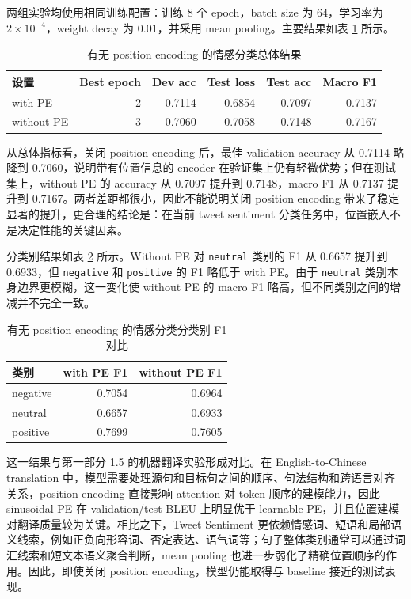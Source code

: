 ﻿\documentclass[UTF8,a4paper,12pt]{ctexart}
\begin{document}
两组实验均使用相同训练配置：训练 8 个 epoch，batch size 为 64，学习率为 $2\times10^{-4}$，weight decay 为 0.01，并采用 mean pooling。主要结果如表 \ref{tab:sentiment-pe-overall} 所示。

\begin{table}[H]
\centering
\caption{有无 position encoding 的情感分类总体结果}
\label{tab:sentiment-pe-overall}
\begin{tabular}{lrrrrr}
\toprule
设置 & Best epoch & Dev acc & Test loss & Test acc & Macro F1 \\
\midrule
with PE & 2 & 0.7114 & 0.6854 & 0.7097 & 0.7137 \\
without PE & 3 & 0.7060 & 0.7058 & 0.7148 & 0.7167 \\
\bottomrule
\end{tabular}
\end{table}

从总体指标看，关闭 position encoding 后，最佳 validation accuracy 从 0.7114 略降到 0.7060，说明带有位置信息的 encoder 在验证集上仍有轻微优势；但在测试集上，without PE 的 accuracy 从 0.7097 提升到 0.7148，macro F1 从 0.7137 提升到 0.7167。两者差距都很小，因此不能说明关闭 position encoding 带来了稳定显著的提升，更合理的结论是：在当前 tweet sentiment 分类任务中，位置嵌入不是决定性能的关键因素。

分类别结果如表 \ref{tab:sentiment-pe-class} 所示。Without PE 对 \texttt{neutral} 类别的 F1 从 0.6657 提升到 0.6933，但 \texttt{negative} 和 \texttt{positive} 的 F1 略低于 with PE。由于 \texttt{neutral} 类别本身边界更模糊，这一变化使 without PE 的 macro F1 略高，但不同类别之间的增减并不完全一致。

\begin{table}[H]
\centering
\caption{有无 position encoding 的情感分类分类别 F1 对比}
\label{tab:sentiment-pe-class}
\begin{tabular}{lrr}
\toprule
类别 & with PE F1 & without PE F1 \\
\midrule
negative & 0.7054 & 0.6964 \\
neutral & 0.6657 & 0.6933 \\
positive & 0.7699 & 0.7605 \\
\bottomrule
\end{tabular}
\end{table}

这一结果与第一部分 1.5 的机器翻译实验形成对比。在 English-to-Chinese translation 中，模型需要处理源句和目标句之间的顺序、句法结构和跨语言对齐关系，position encoding 直接影响 attention 对 token 顺序的建模能力，因此 sinusoidal PE 在 validation/test BLEU 上明显优于 learnable PE，并且位置建模对翻译质量较为关键。相比之下，Tweet Sentiment 更依赖情感词、短语和局部语义线索，例如正负向形容词、否定表达、语气词等；句子整体类别通常可以通过词汇线索和短文本语义聚合判断，mean pooling 也进一步弱化了精确位置顺序的作用。因此，即使关闭 position encoding，模型仍能取得与 baseline 接近的测试表现。
\end{document}
